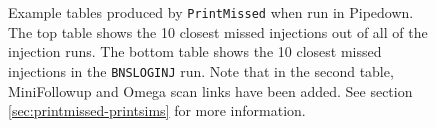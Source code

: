 \begin{figure}[p]
\center
{}
\label{fig:sample-printmissed}
\caption{Example tables produced by \texttt{PrintMissed} when run in Pipedown.
The top table shows the 10 closest missed injections out of all of the
injection runs. The bottom table shows the 10 closest missed injections in the
\texttt{BNSLOGINJ} run. Note that in the second table, MiniFollowup and Omega
scan links have been added. See section \ref{sec:printmissed-printsims} for
more information.}
\end{figure}


